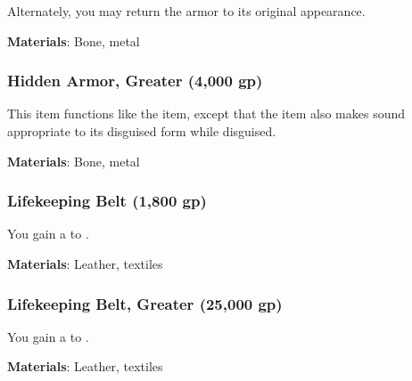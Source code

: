 Alternately, you may return the armor to its original appearance.



\vspace{0.25em}
\textbf{Materials}: Bone, metal


\lowercase{\hypertarget{item:Hidden Armor, Greater}{}}\label{item:Hidden Armor, Greater}
\hypertarget{item:Hidden Armor, Greater}{\subsubsection{Hidden Armor, Greater\hfill{} (4,000 gp)}}

This item functions like the  item, except that the item also makes sound appropriate to its disguised form while disguised.



\vspace{0.25em}
\textbf{Materials}: Bone, metal


\lowercase{\hypertarget{item:Lifekeeping Belt}{}}\label{item:Lifekeeping Belt}
\hypertarget{item:Lifekeeping Belt}{\subsubsection{Lifekeeping Belt\hfill{} (1,800 gp)}}

You gain a   to .



\vspace{0.25em}
\textbf{Materials}: Leather, textiles


\lowercase{\hypertarget{item:Lifekeeping Belt, Greater}{}}\label{item:Lifekeeping Belt, Greater}
\hypertarget{item:Lifekeeping Belt, Greater}{\subsubsection{Lifekeeping Belt, Greater\hfill{} (25,000 gp)}}

You gain a   to .



\vspace{0.25em}
\textbf{Materials}: Leather, textiles


